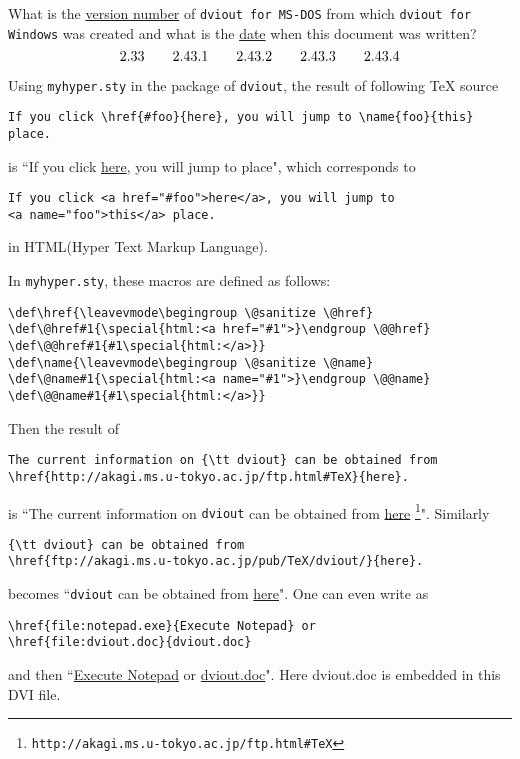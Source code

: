 \documentclass{article}
\begin{document}
What is the \href{#version}{version number} of {\tt dviout for MS-DOS} 
from which {\tt dviout for Windows} was created and
what is the \href{#date}{date} when this document was written?
$$
2.33\quad\quad 2.43.1 \quad\quad 2.43.2\name{version}{\quad}\quad 
2.43.3\quad\quad 2.43.4
$$


Using {\tt myhyper.sty} in the package of {\tt dviout}, the result of 
following {\TeX} source 
\begin{verbatim}
If you click \href{#foo}{here}, you will jump to \name{foo}{this} 
place.
\end{verbatim}
is ``If you click \href{#foo}{here}, you will jump to  
place", which corresponds to
\begin{verbatim}
If you click <a href="#foo">here</a>, you will jump to 
<a name="foo">this</a> place.
\end{verbatim}
in HTML(Hyper Text Markup Language).

In {\tt myhyper.sty}, these macros are defined as follows:
\begin{verbatim}
\def\href{\leavevmode\begingroup \@sanitize \@href}
\def\@href#1{\special{html:<a href="#1">}\endgroup \@@href}
\def\@@href#1{#1\special{html:</a>}}
\def\name{\leavevmode\begingroup \@sanitize \@name}
\def\@name#1{\special{html:<a name="#1">}\endgroup \@@name}
\def\@@name#1{#1\special{html:</a>}}
\end{verbatim}

Then the result of
\begin{verbatim}
The current information on {\tt dviout} can be obtained from 
\href{http://akagi.ms.u-tokyo.ac.jp/ftp.html#TeX}{here}.
\end{verbatim}
is ``The current information on {\tt dviout} can be obtained from 
\href{http://akagi.ms.u-tokyo.ac.jp/ftp.html#TeX}{here}%
\footnote{\tt http://akagi.ms.u-tokyo.ac.jp/ftp.html\#TeX}".  Similarly
\begin{verbatim}
{\tt dviout} can be obtained from 
\href{ftp://akagi.ms.u-tokyo.ac.jp/pub/TeX/dviout/}{here}.
\end{verbatim}
becomes 
``{\tt dviout} can be obtained from 
\href{ftp://akagi.ms.u-tokyo.ac.jp/pub/TeX/dviout/}{here}". 
One can even write as
\begin{verbatim}
\href{file:notepad.exe}{Execute Notepad} or 
\href{file:dviout.doc}{dviout.doc}
\end{verbatim}
and then ``\href{file:notepad.exe}{Execute Notepad} or
\href{file:dviout.doc}{dviout.doc}".
Here dviout.doc is embedded in this DVI file.
\end{document}
